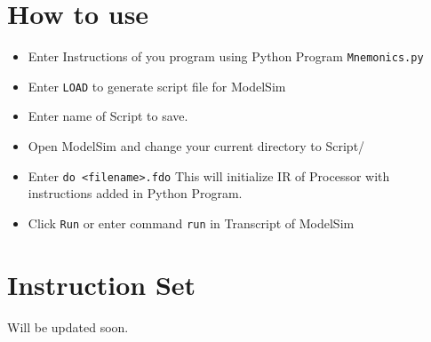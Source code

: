 \documentclass[a4paper,12pt]{article}
\begin{document}
\section{How to use}
\begin{itemize}
\item Enter Instructions of you program using Python Program \texttt{Mnemonics.py}
\item Enter \texttt{LOAD} to generate script file for ModelSim
\item Enter name of Script to save.
\item Open ModelSim and change your current directory to Script/
\item Enter \texttt{do <filename>.fdo}
This will initialize IR of Processor with instructions added in Python Program.
\item Click \texttt{Run} or enter command \texttt{run} in Transcript of ModelSim
\end{itemize}

\section{Instruction Set}
Will be updated soon.
\end{document}
